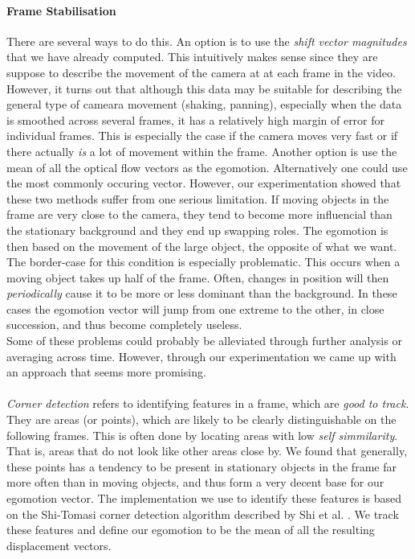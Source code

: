 \paragraph{Frame Stabilisation}
%
There are several ways to do this. An option is to use the \textit{shift vector magnitudes} that we have already computed. This intuitively makes sense since they are suppose to describe the movement of the camera at at each frame in the video. However, it turns out that although this data may be suitable for describing the general type of cameara movement (shaking, panning), especially when the data is smoothed across several frames, it has a relatively high margin of error for individual frames. This is especially the case if the camera moves very fast or if there actually \textit{is} a lot of movement within the frame. Another option is use the mean of all the optical flow vectors as the egomotion. Alternatively one could use the most commonly occuring vector. However, our experimentation showed that these two methods suffer from one serious limitation. If moving objects in the frame are very close to the camera, they tend to become more influencial than the stationary background and they end up swapping roles. The egomotion is then based on the movement of the large object, the opposite of what we want. The border-case for this condition is especially problematic. This occurs when a moving object takes up half of the frame. Often, changes in position will then \textit{periodically} cause it to be more or less dominant than the background. In these cases the egomotion vector will jump from one extreme to the other, in close succession, and thus become completely useless.\\
Some of these problems could probably be alleviated through further analysis or averaging across time. However, through our experimentation we came up with an approach that seems more promising.\\
\\
\textit{Corner detection} refers to identifying features in a frame, which are \textit{good to track}. They are areas (or points), which are likely to be clearly distinguishable on the following frames. This is often done by locating areas with low \textit{self simmilarity}. That is, areas that do not look like other areas close by. We found that generally, these points has a tendency to be present in stationary objects in the frame far more often than in moving objects, and thus form a very decent base for our egomotion vector. The implementation we use to identify these features is based on the Shi-Tomasi corner detection algorithm described by Shi et al. \cite{Shi_1994_3266}. We track these features and define our egomotion to be the mean of all the resulting displacement vectors.
%
